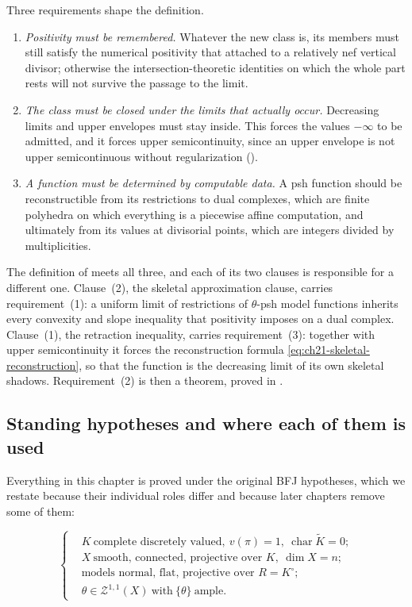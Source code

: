 Three requirements shape the definition.

\begin{enumerate}
\item \emph{Positivity must be remembered.}  Whatever the new class is, its
members must still satisfy the numerical positivity that
 attached to a relatively nef vertical divisor;
otherwise the intersection-theoretic identities on which the whole part
rests will not survive the passage to the limit.
\item \emph{The class must be closed under the limits that actually
occur.}  Decreasing limits and upper envelopes must stay inside.  This
forces the values $-\infty$ to be admitted, and it forces upper
semicontinuity, since an upper envelope is not upper semicontinuous without
regularization ().
\item \emph{A function must be determined by computable data.}  A psh
function should be reconstructible from its restrictions to dual complexes,
which are finite polyhedra on which everything is a piecewise affine
computation, and ultimately from its values at divisorial points, which are
integers divided by multiplicities.
\end{enumerate}

The definition of  meets all three, and each of
its two clauses is responsible for a different one.  Clause~(2), the
skeletal approximation clause, carries requirement~(1): a uniform limit of
restrictions of $\theta$-psh model functions inherits every convexity and
slope inequality that positivity imposes on a dual complex.  Clause~(1), the
retraction inequality, carries requirement~(3): together with upper
semicontinuity it forces the reconstruction formula
\eqref{eq:ch21-skeletal-reconstruction}, so that the function is the
decreasing limit of its own skeletal shadows.  Requirement~(2) is then a
theorem, proved in .

\subsection{Standing hypotheses and where each of them is used}
\label{sec:ch21-hypotheses}

Everything in this chapter is proved under the original BFJ hypotheses,
which we restate because their individual roles differ and because later
chapters remove some of them:

\begin{equation}
\label{eq:ch21-hypotheses}
\left\{
\begin{aligned}
 &K\ \text{complete discretely valued},\ v(\pi)=1,\
   \operatorname{char}\widetilde K=0;\\
 &X\ \text{smooth, connected, projective over }K,\ \dim X=n;\\
 &\text{models normal, flat, projective over }R=K^\circ;\\
 &\theta\in\mathcal Z^{1,1}(X)\ \text{with}\ \{\theta\}\ \text{ample}.
\end{aligned}
\right.
\end{equation}

